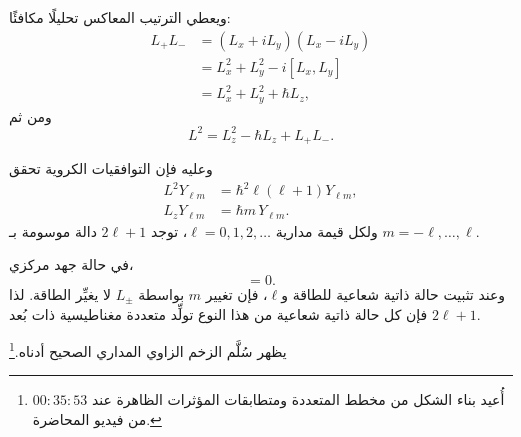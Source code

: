 ويعطي الترتيب المعاكس تحليلًا مكافئًا: \begin{align}
L_+L_-
&=(L_x+iL_y)(L_x-iL_y) \\
&=L_x^2+L_y^2-i[L_x,L_y] \\
&=L_x^2+L_y^2+\hbar L_z,
\end{align} ومن ثم \begin{equation}
L^2=L_z^2-\hbar L_z+L_+L_-.
\end{equation}

\begin{classroomqa}\end{classroomqa}

وعليه فإن التوافقيات الكروية تحقق \begin{align}
L^2Y_{\ell m}
&=\hbar^2\ell(\ell+1)Y_{\ell m}, \\
L_zY_{\ell m}
&=\hbar m\,Y_{\ell m}.
\end{align} ولكل قيمة مدارية \(\ell=0,1,2,\ldots\)، توجد \(2\ell+1\) دالة موسومة بـ \(m=-\ell,\ldots,\ell\).

في حالة جهد مركزي، \begin{equation}
[H,L_i]=0.
\end{equation} وعند تثبيت حالة ذاتية شعاعية للطاقة و\(\ell\)، فإن تغيير \(m\) بواسطة \(L_\pm\) لا يغيِّر الطاقة. لذا فإن كل حالة ذاتية شعاعية من هذا النوع تولِّد متعددة مغناطيسية ذات بُعد \(2\ell+1\).

يظهر سُلَّم الزخم الزاوي المداري الصحيح أدناه.\footnote{أُعيد بناء الشكل من مخطط المتعددة ومتطابقات المؤثرات الظاهرة عند \(00{:}35{:}53\) من فيديو المحاضرة.}

